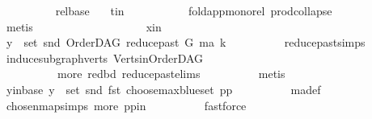 \begin{isabellebody}
\ \ \ \ \ \ \ \ \isamarkupfalse%
\ rel{\isacharunderscore}{\kern0pt}base\ \ \isamarkupfalse%
\ t{\isacharunderscore}{\kern0pt}in\ \isanewline
\ \ \ \ \ \ \ \ \isamarkupfalse%
\ fold{\isacharunderscore}{\kern0pt}app{\isacharunderscore}{\kern0pt}mono{\isacharunderscore}{\kern0pt}rel\ prod{\isachardot}{\kern0pt}collapse\isanewline
\ \ \ \ \ \ \ \ \isamarkupfalse%
\ metis\ \ \ \ \ \ \ \isanewline
\ \ \ \ \isamarkupfalse%
\isanewline
\ \ \ \ \ \ \isamarkupfalse%
\ x{\isacharunderscore}{\kern0pt}in\isanewline
\ \ \ \ \ \ \isamarkupfalse%
\ \isamarkupfalse%
\ {\isachardoublequoteopen}y\ {\isasymin}\ set\ {\isacharparenleft}{\kern0pt}snd\ {\isacharparenleft}{\kern0pt}OrderDAG\ {\isacharparenleft}{\kern0pt}reduce{\isacharunderscore}{\kern0pt}past\ G\ ma{\isacharparenright}{\kern0pt}\ k{\isacharparenright}{\kern0pt}{\isacharparenright}{\kern0pt}{\isachardoublequoteclose}\isanewline
\ \ \ \ \ \ \ \ \isamarkupfalse%
\ reduce{\isacharunderscore}{\kern0pt}past{\isachardot}{\kern0pt}simps\ \isamarkupfalse%
\ induce{\isacharunderscore}{\kern0pt}subgraph{\isacharunderscore}{\kern0pt}verts\ Verts{\isacharunderscore}{\kern0pt}in{\isacharunderscore}{\kern0pt}OrderDAG\ \isanewline
\ \ \ \ \ \ \ \ \ \ more\ red{\isacharunderscore}{\kern0pt}bd\ reduce{\isacharunderscore}{\kern0pt}past{\isachardot}{\kern0pt}elims\isanewline
\ \ \ \ \ \ \ \ \isamarkupfalse%
\ {\isacharparenleft}{\kern0pt}metis{\isacharparenright}{\kern0pt}\isanewline
\ \ \ \ \ \ \isamarkupfalse%
\ \isamarkupfalse%
\ y{\isacharunderscore}{\kern0pt}in{\isacharunderscore}{\kern0pt}base{\isacharcolon}{\kern0pt}\ {\isachardoublequoteopen}y\ {\isasymin}\ set\ {\isacharparenleft}{\kern0pt}snd\ {\isacharparenleft}{\kern0pt}fst\ {\isacharparenleft}{\kern0pt}choose{\isacharunderscore}{\kern0pt}max{\isacharunderscore}{\kern0pt}blue{\isacharunderscore}{\kern0pt}set\ pp{\isacharparenright}{\kern0pt}{\isacharparenright}{\kern0pt}{\isacharparenright}{\kern0pt}{\isachardoublequoteclose}\isanewline
\ \ \ \ \ \ \ \ \isamarkupfalse%
\ ma{\isacharunderscore}{\kern0pt}def\ \isamarkupfalse%
\ chosen{\isacharunderscore}{\kern0pt}map{\isacharunderscore}{\kern0pt}simps{\isacharparenleft}{\kern0pt}{}{\isacharparenright}{\kern0pt}\ more\ pp{\isacharunderscore}{\kern0pt}in\isanewline
\ \ \ \ \ \ \ \ \isamarkupfalse%
\ fastforce\ \isanewline
\ \ \ \ \ \ \isamarkupfalse%

\end{isabellebody}

